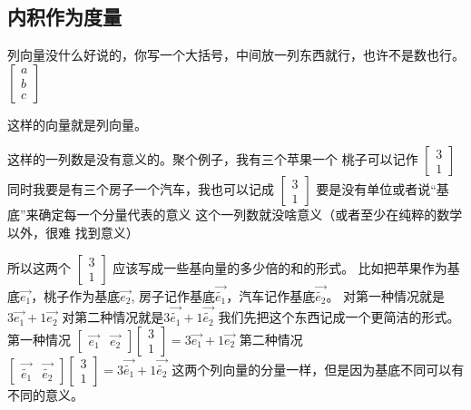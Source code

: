 \documentclass{book}
\begin{document}
\begin{CJK}{UTF8}{gbsn}
    \subsection{内积作为度量}
    列向量没什么好说的，你写一个大括号，中间放一列东西就行，也许不是数也行。
    $\left[\begin{matrix}
                a \\
                b \\
                c
            \end{matrix}\right]$

    这样的向量就是列向量。

    这样的一列数是没有意义的。聚个例子，我有三个苹果一个
    桃子可以记作
    $\left[\begin{matrix}
                3 \\
                1
            \end{matrix}\right]$
    同时我要是有三个房子一个汽车，我也可以记成
    $\left[\begin{matrix}
                3 \\
                1
            \end{matrix}\right]$
    要是没有单位或者说“基底”来确定每一个分量代表的意义
    这个一列数就没啥意义（或者至少在纯粹的数学以外，很难
    找到意义）

    所以这两个
    $\left[\begin{matrix}
                3 \\
                1
            \end{matrix}\right]$
    应该写成一些基向量的多少倍的和的形式。
    比如把苹果作为基底$\vec{e_1}$，桃子作为基底$\vec{e_2}$,
    房子记作基底$\vec{\tilde{e_1}}$，汽车记作基底$\vec{\tilde{e_2}}$。
    对第一种情况就是$3\vec{e_1}+1\vec{e_2}$
    对第二种情况就是$3\vec{\tilde{e_1}}+1\vec{\tilde{e_2}}$
    我们先把这个东西记成一个更简洁的形式。
    第一种情况
    $\left[\begin{matrix}
                \vec{e_1} & \vec{e_2}
            \end{matrix}\right]
        \left[\begin{matrix}
                3 \\
                1
            \end{matrix}\right]=3\vec{e_1}+1\vec{e_2}$
    第二种情况
    $\left[\begin{matrix}
                \vec{\tilde{e_1}} & \vec{\tilde{e_2}}
            \end{matrix}\right]
        \left[\begin{matrix}
                3 \\
                1
            \end{matrix}\right]=3\vec{\tilde{e_1}}+1\vec{\tilde{e_2}}$
    这两个列向量的分量一样，但是因为基底不同可以有
    不同的意义。



\end{CJK}
\end{document}
